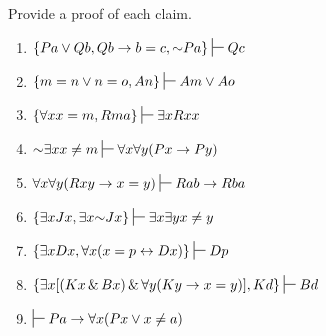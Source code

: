 %
%

\practiceproblems


\problempart
\label{pr.identity}
Provide a proof of each claim.
\begin{enumerate}[label=\arabic*), topsep=0pt, parsep=0pt, itemsep=3pt] 
\item $\{Pa \eor Qb, Qb \eif b=c, \enot Pa\}\sststile{}{} Qc$
\item $\{m=n \eor n=o, An\}\sststile{}{} Am \eor Ao$
\item $\{\forall x x=m, Rma\}\sststile{}{} \exists x Rxx$
\item $\enot \exists x x \neq m \sststile{}{} \forall x\forall y (Px \eif Py)$
\item $\forall x\forall y(Rxy \eif x=y)\sststile{}{} Rab \eif Rba$
\item $\{\exists x Jx, \exists x \enot Jx\}\sststile{}{} \exists x \exists y x\neq y$
\item $\{\exists x Dx, \forall x(x=p \eiff Dx)\}\sststile{}{} Dp$
\item $\{\exists x [(Kx \eand Bx) \eand \forall y(Ky \eif x=y)], Kd\}\sststile{}{} Bd$
\item $\sststile{}{} Pa \eif \forall x(Px \eor x \neq a)$
\end{enumerate}










